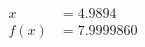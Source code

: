 \documentclass[preview]{standalone}
\begin{document}
\begin{align*}
x &= 4.9894\\f(x) &= 7.9999860
\end{align*}
\end{document}
